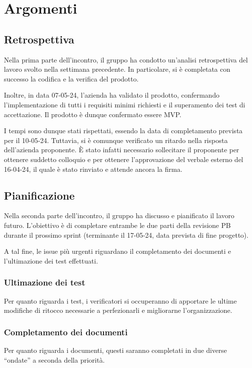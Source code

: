 \section{Argomenti}
\subsection{Retrospettiva}
Nella prima parte dell'incontro, il gruppo ha condotto un'analisi retrospettiva del lavoro svolto nella settimana precedente. In particolare, si è completata con successo la codifica e la verifica del prodotto. 

Inoltre, in data 07-05-24, l'azienda ha validato il prodotto, confermando l'implementazione di tutti i requisiti minimi richiesti e il superamento dei test di accettazione. Il prodotto è dunque confermato essere MVP.

I tempi sono dunque stati rispettati, essendo la data di completamento prevista per il 10-05-24. Tuttavia, si è comunque verificato un ritardo nella risposta dell'azienda proponente. È stato infatti necessario sollecitare il proponente per ottenere suddetto colloquio e per ottenere l'approvazione del verbale esterno del 16-04-24, il quale è stato rinviato e attende ancora la firma.

\subsection{Pianificazione}
\noindent Nella seconda parte dell'incontro, il gruppo ha discusso e pianificato il lavoro futuro. L'obiettivo è di completare entrambe le due parti della revisione PB durante il prossimo sprint (terminante il 17-05-24, data prevista di fine progetto).

A tal fine, le issue più urgenti riguardano il completamento dei documenti e l'ultimazione dei test effettuati.

\subsubsection{Ultimazione dei test}
Per quanto riguarda i test, i verificatori si occuperanno di apportare le ultime modifiche di ritocco necessarie a perfezionarli e migliorarne l'organizzazione.

\subsubsection{Completamento dei documenti}
Per quanto riguarda i documenti, questi saranno completati in due diverse ``ondate'' a seconda della priorità.

